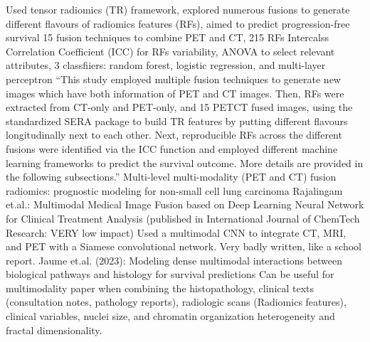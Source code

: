 \documentclass{article}%
\begin{document}
%
Used tensor radiomics (TR) framework, explored numerous fusions to generate different flavours of radiomics features (RFs), aimed to predict progression{-}free survival %
\newline%
\newline%
%
15 fusion techniques to combine PET and CT, 215 RFs %
\newline%
\newline%
%
Intercalss Correlation Coefficient (ICC) for RFs variability, ANOVA to select relevant attributes, 3 classfiiers: random forest, logistic regression, and multi{-}layer perceptron  %
\newline%
\newline%
%
“This study employed multiple fusion techniques to generate new images which have both information of PET and CT images. Then, RFs were extracted from CT{-}only and PET{-}only, and 15 PETCT fused images, using the standardized SERA package to build TR features by putting different flavours longitudinally next to each other. Next, reproducible RFs across the different fusions were identified via the ICC function and employed different machine learning frameworks to predict the survival outcome. More details are provided in the following subsections.”%
\newline%
\newline%
%
Multi{-}level multi{-}modality (PET and CT) fusion radiomics: prognostic modeling for non{-}small cell lung carcinoma%
\newline%
\newline%
%
Rajalingam et.al.: Multimodal Medical Image Fusion based on Deep Learning Neural Network for Clinical Treatment Analysis (published in International Journal of ChemTech Research: VERY low impact)%
\newline%
\newline%
%
Used a multimodal CNN to integrate CT, MRI, and PET with a Siamese convolutional network. %
\newline%
\newline%
%
Very badly written, like a school report. %
\newline%
\newline%
%
Jaume et.al. (2023): Modeling dense multimodal interactions between biological pathways and histology for survival predictions %
\newline%
\newline%
%
Can be useful for multimodality paper when combining the histopathology, clinical texts (consultation notes, pathology reports), radiologic scans (Radiomics features), clinical variables, nuclei size, and chromatin organization heterogeneity and fractal dimensionality. %
\end{document}
